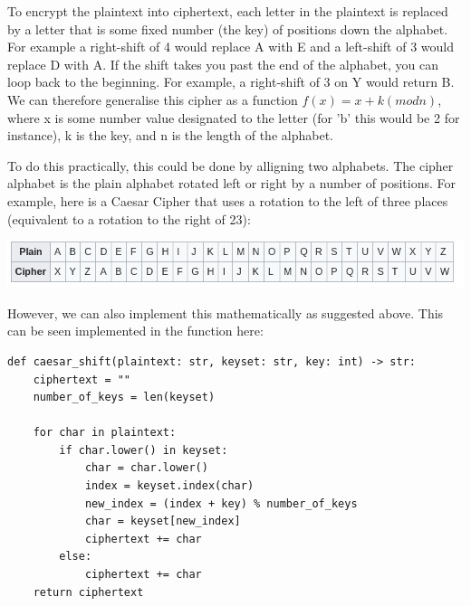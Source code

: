 \documentclass{article}
\begin{document}
To encrypt the plaintext into ciphertext, each
letter in the plaintext is replaced by a letter that is some fixed number (the
key) of positions down the alphabet. For example a right-shift of 4 would
replace A with E and a left-shift of 3 would replace D with A. If the shift
takes you past the end of the alphabet, you can loop back to the beginning. For
example, a right-shift of 3 on Y would return B. We can therefore generalise 
this cipher as a function $f(x) = x + k (mod n) $, where x is some number value
designated to the letter (for 'b' this would be 2 for instance), k is the key, 
and n is the length of the alphabet.
\medskip

To do this practically, this could be done by alligning two alphabets. The
cipher alphabet is the plain alphabet rotated left or right by a number of
positions. For example, here is a Caesar Cipher that uses a rotation to the
left of three places (equivalent to a rotation to the right of 23):
\medskip

\includegraphics[width = \textwidth]{Screenshot 2024-11-24 22.13.38.png}
\medskip

However, we can also implement this mathematically as suggested above.
This can be seen implemented in the function here:
\medskip
\begin{lstlisting}
def caesar_shift(plaintext: str, keyset: str, key: int) -> str:
    ciphertext = ""
    number_of_keys = len(keyset)

    for char in plaintext:
        if char.lower() in keyset:
            char = char.lower()
            index = keyset.index(char)
            new_index = (index + key) % number_of_keys
            char = keyset[new_index]
            ciphertext += char
        else:
            ciphertext += char
    return ciphertext
\end{lstlisting}
\medskip
\end{document}

